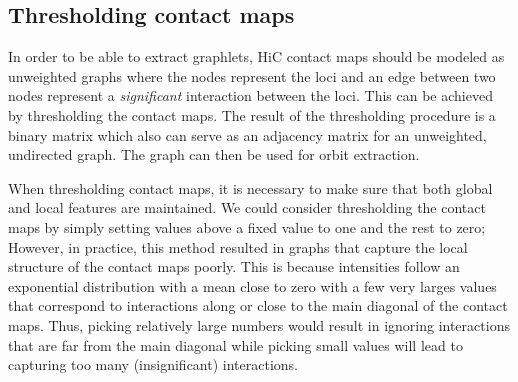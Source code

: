 \documentclass[a4,center,fleqn]{NAR}
\begin{document}
\subsection{Thresholding contact maps}
In order to be able to extract graphlets, HiC contact maps should be modeled as
unweighted graphs where the nodes represent the loci and an edge between two 
nodes represent a \textit{significant} interaction between the loci.
This can be achieved by thresholding the contact maps. The result
of the thresholding procedure is a binary matrix which also can serve as
an adjacency matrix for an unweighted, undirected graph. The graph can then be
used for orbit extraction.

When thresholding contact maps, it is necessary to make sure
that both global and local features are maintained. We could consider 
thresholding the contact maps by simply setting values above a fixed value to
one and the rest to zero; However, in practice, this method resulted in graphs
that capture the local structure of the contact maps poorly. This is because
intensities follow an exponential distribution with a mean close to zero
with a few very larges values that correspond to interactions along 
or close to the main diagonal of the contact maps.
Thus, picking relatively large numbers would result in ignoring interactions
that are far from the main diagonal while picking small values will lead to
capturing too many (insignificant) interactions.
\end{document}
